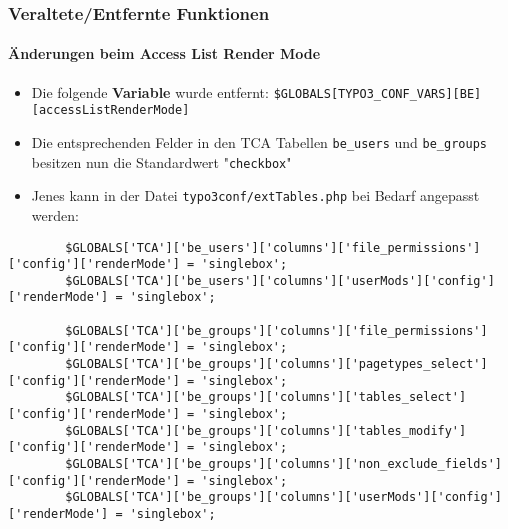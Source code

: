 
\begin{frame}[fragile]
	\frametitle{Veraltete/Entfernte Funktionen}
	\framesubtitle{Änderungen beim Access List Render Mode}

	\lstset{basicstyle=\tiny\ttfamily}

	\begin{itemize}

		\item Die folgende \textbf{Variable} wurde entfernt:
			\small\texttt{\$GLOBALS[TYPO3\_CONF\_VARS][BE][accessListRenderMode]}\normalsize

		\item Die entsprechenden Felder in den TCA Tabellen \texttt{be\_users} und \texttt{be\_groups}
			besitzen nun die Standardwert "\texttt{checkbox}"

		\item Jenes kann in der Datei \texttt{typo3conf/extTables.php} bei Bedarf angepasst werden:

	\end{itemize}

	\begin{lstlisting}
		$GLOBALS['TCA']['be_users']['columns']['file_permissions']['config']['renderMode'] = 'singlebox';
		$GLOBALS['TCA']['be_users']['columns']['userMods']['config']['renderMode'] = 'singlebox';

		$GLOBALS['TCA']['be_groups']['columns']['file_permissions']['config']['renderMode'] = 'singlebox';
		$GLOBALS['TCA']['be_groups']['columns']['pagetypes_select']['config']['renderMode'] = 'singlebox';
		$GLOBALS['TCA']['be_groups']['columns']['tables_select']['config']['renderMode'] = 'singlebox';
		$GLOBALS['TCA']['be_groups']['columns']['tables_modify']['config']['renderMode'] = 'singlebox';
		$GLOBALS['TCA']['be_groups']['columns']['non_exclude_fields']['config']['renderMode'] = 'singlebox';
		$GLOBALS['TCA']['be_groups']['columns']['userMods']['config']['renderMode'] = 'singlebox';
	\end{lstlisting}

\end{frame}

